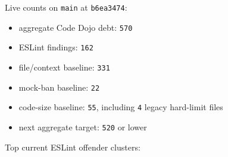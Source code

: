 Live counts on \texttt{m\allowbreak{}a\allowbreak{}i\allowbreak{}n} at \texttt{b\allowbreak{}6\allowbreak{}e\allowbreak{}a\allowbreak{}3\allowbreak{}4\allowbreak{}7\allowbreak{}4}:

\begin{itemize}
\tightlist
\item
  aggregate Code Dojo debt: \texttt{5\allowbreak{}7\allowbreak{}0}
\item
  ESLint findings: \texttt{1\allowbreak{}6\allowbreak{}2}
\item
  file/context baseline: \texttt{3\allowbreak{}3\allowbreak{}1}
\item
  mock-ban baseline: \texttt{2\allowbreak{}2}
\item
  code-size baseline: \texttt{5\allowbreak{}5}, including \texttt{4} legacy hard-limit files
\item
  next aggregate target: \texttt{5\allowbreak{}2\allowbreak{}0} or lower
\end{itemize}

Top current ESLint offender clusters:

